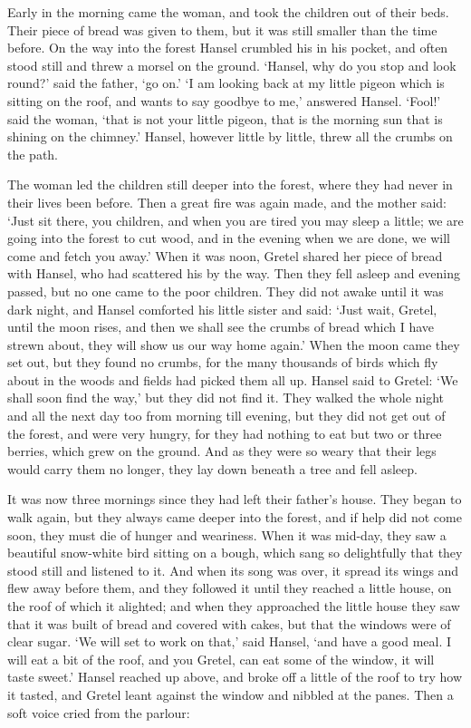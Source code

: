 \documentclass[oneside,11pt]{book} %
\begin{document}
Early in the morning came the woman, and took the children out of their beds. Their piece of bread was given to them, but it was still smaller than the time before. On the way into the forest Hansel crumbled his in his pocket, and often stood still and threw a morsel on the ground. `Hansel, why do you stop and look round?' said the father, `go on.' `I am looking back at my little pigeon which is sitting on the roof, and wants to say goodbye to me,' answered Hansel. `Fool!' said the woman, `that is not your little pigeon, that is the morning sun that is shining on the chimney.' Hansel, however little by little, threw all the crumbs on the path.

The woman led the children still deeper into the forest, where they had never in their lives been before. Then a great fire was again made, and the mother said: `Just sit there, you children, and when you are tired you may sleep a little; we are going into the forest to cut wood, and in the evening when we are done, we will come and fetch you away.' When it was noon, Gretel shared her piece of bread with Hansel, who had scattered his by the way. Then they fell asleep and evening passed, but no one came to the poor children. They did not awake until it was dark night, and Hansel comforted his little sister and said: `Just wait, Gretel, until the moon rises, and then we shall see the crumbs of bread which I have strewn about, they will show us our way home again.' When the moon came they set out, but they found no crumbs, for the many thousands of birds which fly about in the woods and fields had picked them all up. Hansel said to Gretel: `We shall soon find the way,' but they did not find it. They walked the whole night and all the next day too from morning till evening, but they did not get out of the forest, and were very hungry, for they had nothing to eat but two or three berries, which grew on the ground. And as they were so weary that their legs would carry them no longer, they lay down beneath a tree and fell asleep.

It was now three mornings since they had left their father's house. They began to walk again, but they always came deeper into the forest, and if help did not come soon, they must die of hunger and weariness. When it was mid-day, they saw a beautiful snow-white bird sitting on a bough, which sang so delightfully that they stood still and listened to it. And when its song was over, it spread its wings and flew away before them, and they followed it until they reached a little house, on the roof of
which it alighted; and when they approached the little house they saw that it was built of bread and covered with cakes, but that the windows were of clear sugar. `We will set to work on that,' said Hansel, `and have a good meal. I will eat a bit of the roof, and you Gretel, can eat some of the window, it will taste sweet.' Hansel reached up above, and broke off a little of the roof to try how it tasted, and Gretel leant against the window and nibbled at the panes. Then a soft voice cried
from the parlour:
\end{document}

